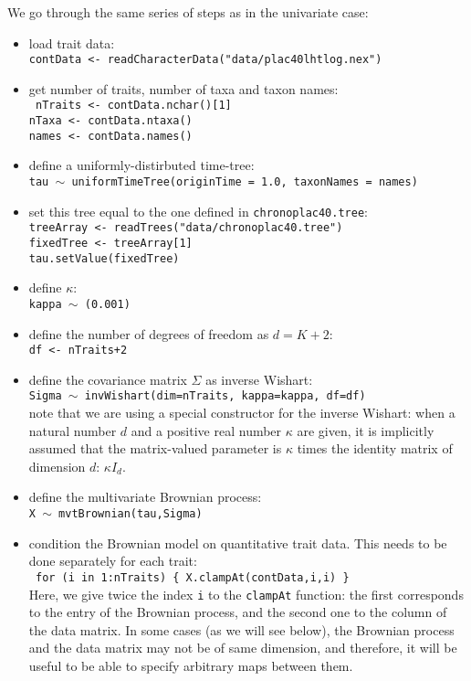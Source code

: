 \documentclass[usletter]{article}
\newcommand{\cmd}[1]{\texttt{#1}}
\begin{document}
We go through the same series of steps as in the univariate case:
\begin{itemize}
\item
load trait data:
\\
\cmd{contData <- readCharacterData("data/plac40lhtlog.nex")}
\item
get number of traits, number of taxa and taxon names:
\\
\cmd{
nTraits <- contData.nchar()[1]
\\
nTaxa <- contData.ntaxa()
\\
names <- contData.names()
}
\item
define a uniformly-distirbuted time-tree:
\\
\cmd{tau $\sim$ uniformTimeTree(originTime = 1.0, taxonNames = names)}
\item
set this tree equal to the one defined in \cmd{chronoplac40.tree}:
\\
\cmd{treeArray <- readTrees("data/chronoplac40.tree")
\\
fixedTree <- treeArray[1]
\\
tau.setValue(fixedTree)}
\item
define $\kappa$:
\\
\cmd{kappa $\sim$ (0.001)}
\item
define the number of degrees of freedom as $d = K+2$:
\\
\cmd{df <- nTraits+2}
\item
define the covariance matrix $\Sigma$ as inverse Wishart:
\\
\cmd{Sigma $\sim$ invWishart(dim=nTraits, kappa=kappa, df=df)}
\\
note that we are using a special constructor for the inverse Wishart: when a natural number $d$ and a positive real number $\kappa$ are given, it is implicitly assumed that the matrix-valued parameter is $\kappa$ times the identity matrix of dimension $d$: $\kappa I_d$.
\item
define the multivariate Brownian process:
\\
\cmd{X $\sim$ mvtBrownian(tau,Sigma)}
\item
condition the Brownian model on quantitative trait data.
This needs to be done separately for each trait:
\\
\cmd{
for (i in 1:nTraits)    \{
        X.clampAt(contData,i,i)
\}
}
\\
Here, we give twice the index \cmd{i} to the \cmd{clampAt} function: the first corresponds to the entry of the Brownian process, and the second one to the column of the data matrix. In some cases (as we will see below), the Brownian process and the data matrix may not be of same dimension, and therefore, it will be useful to be able to specify arbitrary maps between them.
\end{itemize}
\end{document}
